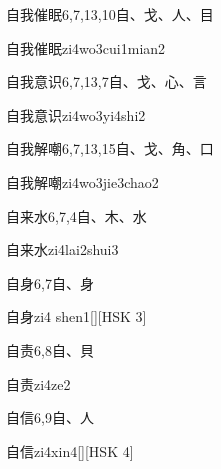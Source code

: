 \begin{entry}{自我催眠}{6,7,13,10}{⾃、⼽、⼈、⽬}
  \begin{phonetics}{自我催眠}{zi4wo3cui1mian2}
  \end{phonetics}
\end{entry}

\begin{entry}{自我意识}{6,7,13,7}{⾃、⼽、⼼、⾔}
  \begin{phonetics}{自我意识}{zi4wo3yi4shi2}
  \end{phonetics}
\end{entry}

\begin{entry}{自我解嘲}{6,7,13,15}{⾃、⼽、⾓、⼝}
  \begin{phonetics}{自我解嘲}{zi4wo3jie3chao2}
  \end{phonetics}
\end{entry}

\begin{entry}{自来水}{6,7,4}{⾃、⽊、⽔}
  \begin{phonetics}{自来水}{zi4lai2shui3}
  \end{phonetics}
\end{entry}

\begin{entry}{自身}{6,7}{⾃、⾝}
  \begin{phonetics}{自身}{zi4 shen1}[][HSK 3]
  \end{phonetics}
\end{entry}

\begin{entry}{自责}{6,8}{⾃、⾙}
  \begin{phonetics}{自责}{zi4ze2}
  \end{phonetics}
\end{entry}

\begin{entry}{自信}{6,9}{⾃、⼈}
  \begin{phonetics}{自信}{zi4xin4}[][HSK 4]
  \end{phonetics}
\end{entry}

